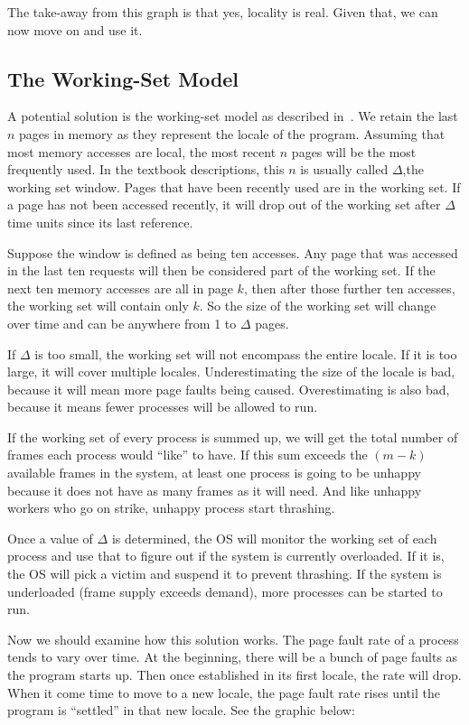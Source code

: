 The take-away from this graph is that yes, locality is real. Given that, we can now move on and use it.


\subsection*{The Working-Set Model}

A potential solution is the working-set model as described in~\cite{osc}. We retain the last $n$ pages in memory as they represent the locale of the program. Assuming that most memory accesses are local, the most recent $n$ pages will be the most frequently used. In the textbook descriptions, this $n$ is usually called $\Delta$,the working set window. Pages that have been recently used are in the working set. If a page has not been accessed recently, it will drop out of the working set after $\Delta$ time units since its last reference. 

Suppose the window is defined as being ten accesses. Any page that was accessed in the last ten requests will then be considered part of the working set. If the next ten memory accesses are all in page $k$, then after those further ten accesses, the working set will contain only $k$. So the size of the working set will change over time and can be anywhere from 1 to $\Delta$ pages.

If $\Delta$ is too small, the working set will not encompass the entire locale. If it is too large, it will cover multiple locales. Underestimating the size of the locale is bad, because it will mean more page faults being caused. Overestimating is also bad, because it means fewer processes will be allowed to run.

If the working set of every process is summed up, we will get the total number of frames each process would ``like'' to have. If this sum exceeds the $(m-k)$ available frames in the system, at least one process is going to be unhappy because it does not have as many frames as it will need. And like unhappy workers who go on strike, unhappy process start thrashing.

Once a value of $\Delta$ is determined, the OS will monitor the working set of each process and use that to figure out if the system is currently overloaded. If it is, the OS will pick a victim and suspend it to prevent thrashing. If the system is underloaded (frame supply exceeds demand), more processes can be started to run.

Now we should examine how this solution works. The page fault rate of a process tends to vary over time. At the beginning, there will be a bunch of page faults as the program starts up. Then once established in its first locale, the rate will drop. When it come time to move to a new locale, the page fault rate rises until the program is ``settled'' in that new locale. See the graphic below:

